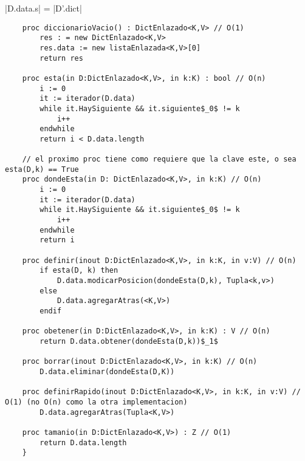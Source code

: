 \documentclass[10pt,a4paper]{article}
\begin{document}
{}

{|D.data.s| = |D'.dict| \land \\
}

\begin{lstlisting}
	proc diccionarioVacio() : DictEnlazado<K,V> // O(1)
		res : = new DictEnlazado<K,V>
		res.data := new listaEnlazada<K,V>[0]
		return res

	proc esta(in D:DictEnlazado<K,V>, in k:K) : bool // O(n)
		i := 0 
		it := iterador(D.data)
		while it.HaySiguiente && it.siguiente$_0$ != k
			i++
		endwhile
		return i < D.data.length

	// el proximo proc tiene como requiere que la clave este, o sea esta(D,k) == True
	proc dondeEsta(in D: DictEnlazado<K,V>, in k:K) // O(n)
		i := 0 
		it := iterador(D.data)
		while it.HaySiguiente && it.siguiente$_0$ != k
			i++
		endwhile
		return i

	proc definir(inout D:DictEnlazado<K,V>, in k:K, in v:V) // O(n)
		if esta(D, k) then
			D.data.modicarPosicion(dondeEsta(D,k), Tupla<k,v>)
		else
			D.data.agregarAtras(<K,V>)
		endif

	proc obetener(in D:DictEnlazado<K,V>, in k:K) : V // O(n)
		return D.data.obtener(dondeEsta(D,k))$_1$

	proc borrar(inout D:DictEnlazado<K,V>, in k:K) // O(n)
		D.data.eliminar(dondeEsta(D,K))

	proc definirRapido(inout D:DictEnlazado<K,V>, in k:K, in v:V) // O(1) (no O(n) como la otra implementacion)
		D.data.agregarAtras(Tupla<K,V>)

	proc tamanio(in D:DictEnlazado<K,V>) : Z // O(1)
		return D.data.length
	}
\end{lstlisting}
\end{document}
